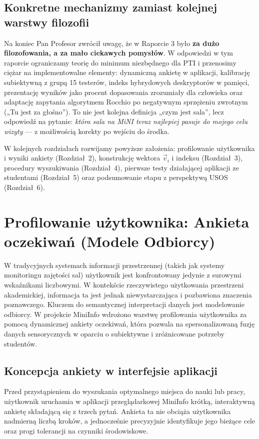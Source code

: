 \documentclass[14pt,a4paper]{extarticle}
\begin{document}
\subsection{Konkretne mechanizmy zamiast kolejnej warstwy filozofii}
Na koniec Pan Profesor zwrócił uwagę, że w Raporcie 3 było \textbf{za dużo filozofowania, a za mało ciekawych pomysłów}. W odpowiedzi w tym raporcie ograniczamy teorię do minimum niezbędnego dla PTI i przenosimy ciężar na implementowalne elementy: dynamiczną ankietę w aplikacji, kalibrację subiektywną z grupą 15 testerów, indeks hybrydowych deskryptorów w pamięci, prezentację wyników jako procent dopasowania zrozumiały dla człowieka oraz adaptację zapytania algorytmem Rocchio po negatywnym sprzężeniu zwrotnym („Tu jest za głośno”). To nie jest kolejna definicja „czym jest sala”, lecz odpowiedź na pytanie: \emph{która sala na MiNI teraz najlepiej pasuje do mojego celu wizyty} --- z możliwością korekty po wejściu do środka.

W kolejnych rozdziałach rozwijamy powyższe założenia: profilowanie użytkownika i wyniki ankiety (Rozdział~2), konstrukcję wektora $\vec{v}_i$ i indeksu (Rozdział~3), procedury wyszukiwania (Rozdział~4), pierwsze testy działającej aplikacji ze studentami (Rozdział~5) oraz podsumowanie etapu z perspektywą USOS (Rozdział~6).

\section{Profilowanie użytkownika: Ankieta oczekiwań (Modele Odbiorcy)}

W tradycyjnych systemach informacji przestrzennej (takich jak systemy monitoringu zajętości sal) użytkownik jest konfrontowany jedynie z surowymi wskaźnikami liczbowymi. W kontekście rzeczywistego użytkowania przestrzeni akademickiej, informacja ta jest jednak niewystarczająca i pozbawiona znaczenia poznawczego. Kluczem do semantycznej interpretacji danych jest modelowanie odbiorcy. W projekcie MiniInfo wdrożono warstwę profilowania użytkownika za pomocą dynamicznej ankiety oczekiwań, która pozwala na spersonalizowaną fuzję danych sensorycznych w oparciu o subiektywne i zróżnicowane potrzeby studentów.

\subsection{Koncepcja ankiety w interfejsie aplikacji}
Przed przystąpieniem do wyszukania optymalnego miejsca do nauki lub pracy, użytkownik uruchamia w aplikacji przeglądarkowej MiniInfo krótką, interaktywną ankietę składającą się z trzech pytań. Ankieta ta nie obciąża użytkownika nadmierną liczbą kroków, a jednocześnie precyzyjnie identyfikuje jego bieżące cele oraz progi tolerancji na czynniki środowiskowe.
\end{document}
